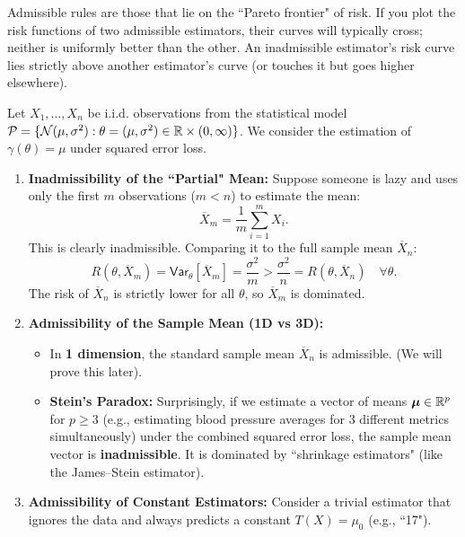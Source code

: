 Admissible rules are those that lie on the ``Pareto frontier" of risk. If you plot the risk functions of two admissible estimators, their curves will typically cross; neither is uniformly better than the other. 
An inadmissible estimator's risk curve lies strictly above another estimator's curve (or touches it but goes higher elsewhere).

\medskip

\begin{ex}
    
Let \(X_1, \dots, X_n\) be i.i.d. observations from the statistical model \(\mathcal{P} = \{ \mathcal{N}(\mu, \sigma^2) : \theta = (\mu, \sigma^2) \in \mathbb{R} \times (0, \infty) \}\). We consider the estimation of \(\gamma(\theta) = \mu\) under squared error loss.

\begin{enumerate}[label=\alph*)]
    \item \textbf{Inadmissibility of the ``Partial" Mean:}
    Suppose someone is lazy and uses only the first \(m\) observations (\(m < n\)) to estimate the mean:
    \[
    \overline{X}_m = \frac{1}{m} \sum_{i=1}^m X_i.
    \]
    This is clearly inadmissible. Comparing it to the full sample mean \(\overline{X}_n\):
    \[
    R(\theta, \overline{X}_m) = \mathsf{Var}_{\theta}[\overline{X}_m] = \frac{\sigma^2}{m} > \frac{\sigma^2}{n} = R(\theta, \overline{X}_n) \quad \forall \theta.
    \]
    The risk of \(\overline{X}_n\) is strictly lower for all \(\theta\), so \(\overline{X}_m\) is dominated.

    \item \textbf{Admissibility of the Sample Mean (1D vs 3D):}
    \begin{itemize}
        \item In \textbf{1 dimension}, the standard sample mean \(\overline{X}_n\) is admissible. (We will prove this later).
        \item \textbf{Stein's Paradox:} Surprisingly, if we estimate a vector of means \(\boldsymbol{\mu} \in \mathbb{R}^p\) for \(p \ge 3\) (e.g., estimating blood pressure averages for 3 different metrics simultaneously) under the combined squared error loss, the sample mean vector is \textbf{inadmissible}. It is dominated by ``shrinkage estimators" (like the James--Stein estimator).
    \end{itemize}

    \item \textbf{Admissibility of Constant Estimators:}
    Consider a trivial estimator that ignores the data and always predicts a constant \(T(X) = \mu_0\) (e.g., ``17").


\end{enumerate}
\end{ex}
